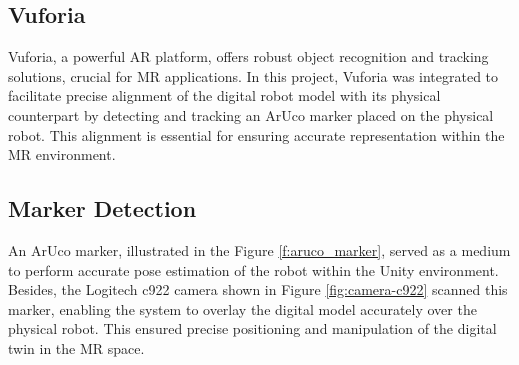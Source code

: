 \subsection{Vuforia}
\label{section:marker-detection}

Vuforia, a powerful \ac{AR} platform, offers robust object recognition and tracking solutions, crucial for \ac{MR} applications. In this project, Vuforia was integrated to facilitate precise alignment of the digital robot model with its physical counterpart by detecting and tracking an ArUco marker placed on the physical robot. This alignment is essential for ensuring accurate representation within the \ac{MR} environment.



\subsection{Marker Detection}

An ArUco marker, illustrated in the Figure \ref{f:aruco_marker}, served as a medium to perform accurate pose estimation of the robot within the Unity environment. Besides, the Logitech c922 camera shown in Figure \ref{fig:camera-c922} scanned this marker, enabling the system to overlay the digital model accurately over the physical robot. This ensured precise positioning and manipulation of the digital twin in the \ac{MR} space.

